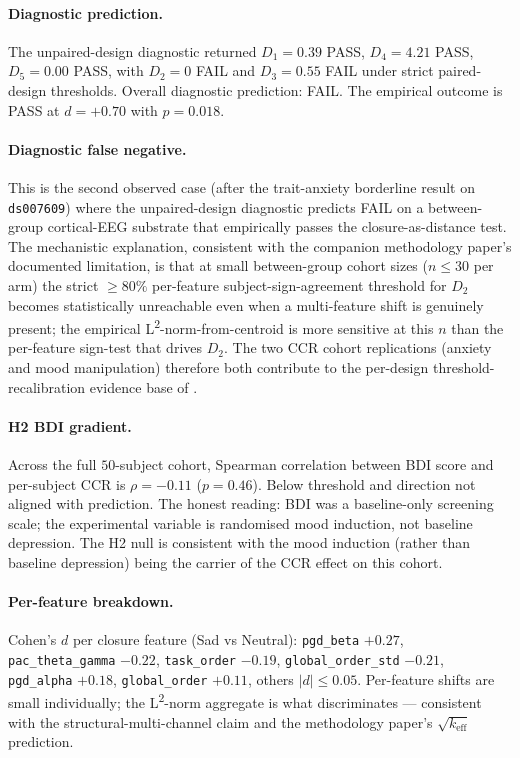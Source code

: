 \documentclass[11pt,a4paper]{article}
\begin{document}
\paragraph{Diagnostic prediction.} The unpaired-design diagnostic returned $D_1 = 0.39$ PASS, $D_4 = 4.21$ PASS, $D_5 = 0.00$ PASS, with $D_2 = 0$ FAIL and $D_3 = 0.55$ FAIL under strict paired-design thresholds. Overall diagnostic prediction: FAIL. The empirical outcome is PASS at $d = +0.70$ with $p = 0.018$.

\paragraph{Diagnostic false negative.} This is the second observed case (after the trait-anxiety borderline result on \texttt{ds007609}) where the unpaired-design diagnostic predicts FAIL on a between-group cortical-EEG substrate that empirically passes the closure-as-distance test. The mechanistic explanation, consistent with the companion methodology paper's documented limitation, is that at small between-group cohort sizes ($n \leq 30$ per arm) the strict $\geq 80\%$ per-feature subject-sign-agreement threshold for $D_2$ becomes statistically unreachable even when a multi-feature shift is genuinely present; the empirical L\textsuperscript{2}-norm-from-centroid is more sensitive at this $n$ than the per-feature sign-test that drives $D_2$. The two CCR cohort replications (anxiety and mood manipulation) therefore both contribute to the per-design threshold-recalibration evidence base of \citep{SmartClosureDistance}.

\paragraph{H2 BDI gradient.} Across the full $50$-subject cohort, Spearman correlation between BDI score and per-subject CCR is $\rho = -0.11$ ($p = 0.46$). Below threshold and direction not aligned with prediction. The honest reading: BDI was a baseline-only screening scale; the experimental variable is randomised mood induction, not baseline depression. The H2 null is consistent with the mood induction (rather than baseline depression) being the carrier of the CCR effect on this cohort.

\paragraph{Per-feature breakdown.} Cohen's $d$ per closure feature (Sad vs Neutral): \texttt{pgd\_beta} $+0.27$, \texttt{pac\_theta\_gamma} $-0.22$, \texttt{task\_order} $-0.19$, \texttt{global\_order\_std} $-0.21$, \texttt{pgd\_alpha} $+0.18$, \texttt{global\_order} $+0.11$, others $|d| \leq 0.05$. Per-feature shifts are small individually; the L\textsuperscript{2}-norm aggregate is what discriminates --- consistent with the structural-multi-channel claim and the methodology paper's $\sqrt{k_\mathrm{eff}}$ prediction.
\end{document}
